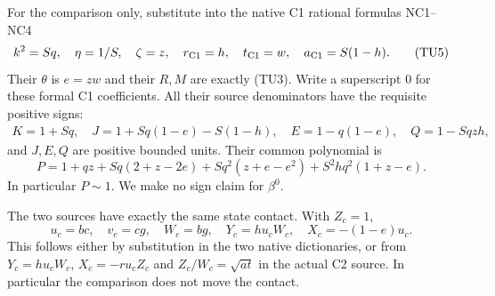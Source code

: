 For the comparison only, substitute into the native C1 rational
formulas NC1--NC4
\[
 k^2=Sq,\quad \eta=1/S,\quad \zeta=z,\quad
 r_{\rm C1}=h,\quad t_{\rm C1}=w,\quad
 a_{\rm C1}=S(1-h).                                     \tag{TU5}
\]
Their $\theta$ is $e=zw$ and their $R,M$ are exactly (TU3).
Write a superscript $0$ for these formal C1 coefficients.
All their source denominators have the requisite positive signs:
\[
\begin{gathered}
 K=1+Sq,\quad J=1+Sq(1-e)-S(1-h),\quad
 E=1-q(1-e),\quad Q=1-Sqzh,
\end{gathered}
\]
and $J,E,Q$ are positive bounded units.  Their common polynomial is
\[
 P=1+qz+Sq(2+z-2e)+Sq^2(z+e-e^2)+S^2hq^2(1+z-e).
                                                               \tag{TU6}
\]
In particular $P\sim1$.  We make no sign claim for $\beta^0$.

The two sources have exactly the same state contact.  With $Z_c=1$,
\[
 u_c=bc,\quad v_c=cg,\quad W_c=bg,\quad
 Y_c=hu_cW_c,\quad X_c=-(1-e)u_c.                       \tag{TU7}
\]
This follows either by substitution in the two native dictionaries,
or from $Y_c=hu_cW_c$, $X_c=-ru_cZ_c$ and
$Z_c/W_c=\sqrt{at}$ in the actual C2 source.  In particular
the comparison does not move the contact.

